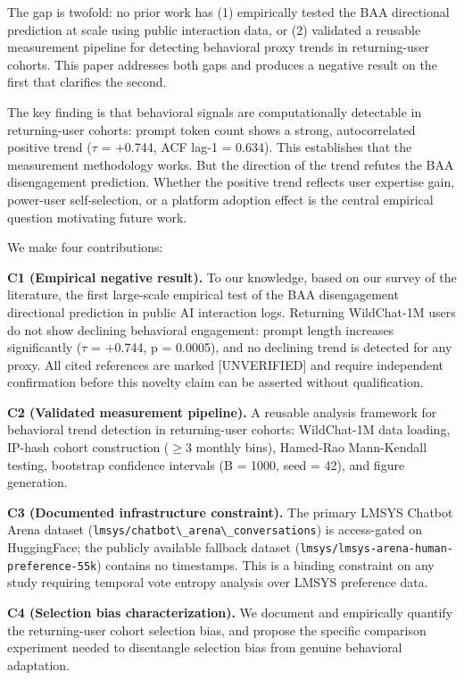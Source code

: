 The gap is twofold: no prior work has (1) empirically tested the BAA directional prediction at scale using public interaction data, or (2) validated a reusable measurement pipeline for detecting behavioral proxy trends in returning-user cohorts. This paper addresses both gaps and produces a negative result on the first that clarifies the second.

The key finding is that behavioral signals are computationally detectable in returning-user cohorts: prompt token count shows a strong, autocorrelated positive trend ($\tau$ = +0.744, ACF lag-1 = 0.634). This establishes that the measurement methodology works. But the direction of the trend refutes the BAA disengagement prediction. Whether the positive trend reflects user expertise gain, power-user self-selection, or a platform adoption effect is the central empirical question motivating future work.

We make four contributions:

\textbf{C1 (Empirical negative result).} To our knowledge, based on our survey of the literature, the first large-scale empirical test of the BAA disengagement directional prediction in public AI interaction logs. Returning WildChat-1M users do not show declining behavioral engagement: prompt length increases significantly ($\tau$ = +0.744, p = 0.0005), and no declining trend is detected for any proxy. All cited references are marked [UNVERIFIED] and require independent confirmation before this novelty claim can be asserted without qualification.

\textbf{C2 (Validated measurement pipeline).} A reusable analysis framework for behavioral trend detection in returning-user cohorts: WildChat-1M data loading, IP-hash cohort construction ($\geq 3$ monthly bins), Hamed-Rao Mann-Kendall testing, bootstrap confidence intervals (B = 1000, seed = 42), and figure generation.

\textbf{C3 (Documented infrastructure constraint).} The primary LMSYS Chatbot Arena dataset (\texttt{lmsys/chatbot\textbackslash \_arena\textbackslash \_conversations}) is access-gated on HuggingFace; the publicly available fallback dataset (\texttt{lmsys/lmsys-arena-human-preference-55k}) contains no timestamps. This is a binding constraint on any study requiring temporal vote entropy analysis over LMSYS preference data.

\textbf{C4 (Selection bias characterization).} We document and empirically quantify the returning-user cohort selection bias, and propose the specific comparison experiment needed to disentangle selection bias from genuine behavioral adaptation.


